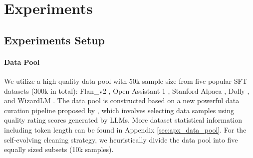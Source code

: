 
\section{Experiments}\label{sec:exp}

\subsection{Experiments Setup}

\paragraph{Data Pool} We utilize a high-quality data pool with 50k sample size from five popular SFT datasets (300k in total): Flan\_v2 \citep{longpre2023flan}, Open Assistant 1 \citep{kopf2024openassistant}, Stanford Alpaca \citep{stanford_alpaca2023}, Dolly \citep{databricks2023dolly}, and WizardLM \citep{xu2023wizardlm}. The data pool is constructed based on a new powerful data curation pipeline proposed by \citep{pang2024improving}, which involves selecting data samples using quality rating scores generated by LLMs.
More dataset statistical information including token length can be found in Appendix \ref{sec:apx_data_pool}. For the self-evolving cleaning strategy, we heuristically divide the data pool into five equally sized subsets (10k samples).




